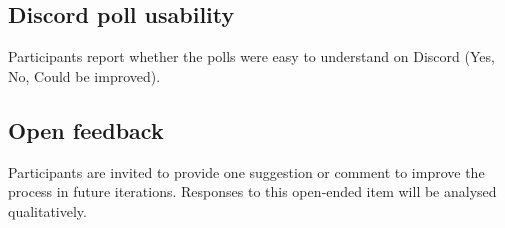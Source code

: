 \subsection*{Discord poll usability}
Participants report whether the polls were easy to understand on Discord
(Yes, No, Could be improved).

\subsection*{Open feedback}
Participants are invited to provide one suggestion or comment to improve
the process in future iterations.  Responses to this open‑ended item will
be analysed qualitatively.

